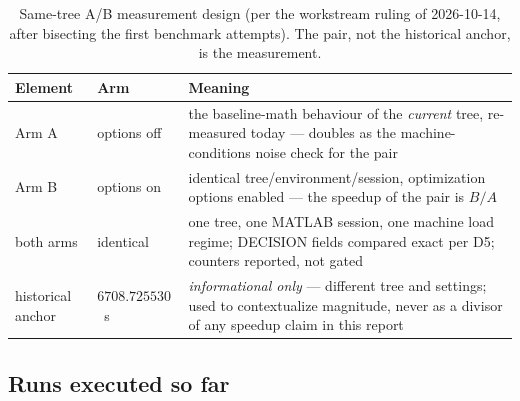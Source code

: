 \documentclass[12pt,a4paper]{article}
\newcommand{\second}{\ifmmode\,\mathrm{s}\else\ s\fi}
\begin{document}
\begin{table}[H]\centering\footnotesize
\caption{Same-tree A/B measurement design (per the workstream ruling of
2026-10-14, after bisecting the first benchmark attempts).  The pair, not
the historical anchor, is the measurement.}
\label{tab:abdesign}
\begin{tabularx}{\textwidth}{l l X}
\toprule
Element & Arm & Meaning\\
\midrule
Arm A & options off & the baseline-math behaviour of the \emph{current} tree,
re-measured today --- doubles as the machine-conditions noise check for the
pair\\
Arm B & options on & identical tree/environment/session, optimization
options enabled --- the speedup of the pair is $B/A$\\
both arms & identical & one tree, one MATLAB session, one machine load
regime; DECISION fields compared exact per D5; counters reported, not
gated\\
historical anchor & $6708.725530$\second{} & \emph{informational only} ---
different tree and settings; used to contextualize magnitude, never as a
divisor of any speedup claim in this report\\
\bottomrule
\end{tabularx}
\end{table}

\subsection{Runs executed so far}\label{sec:failedrun}
\end{document}
